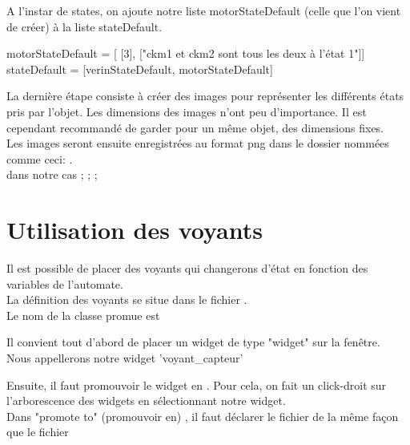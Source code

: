 A l'instar de states, on ajoute notre liste motorStateDefault (celle que l'on vient de créer) à la liste stateDefault.

\begin{pyCode}
    motorStateDefault = [ [3], ["ckm1 et ckm2 sont tous les deux à l'état 1"]]
    stateDefault = [verinStateDefault, motorStateDefault]
\end{pyCode}



La dernière étape consiste à créer des images pour représenter les différents états pris par l'objet. Les dimensions des images n'ont peu d'importance. Il est cependant recommandé de garder pour un même objet, des dimensions fixes. \\

Les images seront ensuite enregistrées au format png dans le dossier   nommées comme ceci: .\\

dans notre cas  ;  ;  ; 



\newpage
\section{Utilisation des voyants}

Il est possible de placer des voyants qui changerons d'état en fonction des variables de l'automate. \\
La définition des voyants se situe dans le fichier .\\
Le  nom de la classe promue est 



Il convient tout d'abord de placer un widget de type "widget" sur la fenêtre. \\
Nous appellerons notre widget 'voyant\_capteur' \\




Ensuite, il faut promouvoir le widget en .
Pour cela, on fait un click-droit sur l'arborescence des widgets en sélectionnant notre widget. \\
Dans "promote to" (promouvoir en) , il faut déclarer le fichier  de la même façon que le fichier 

